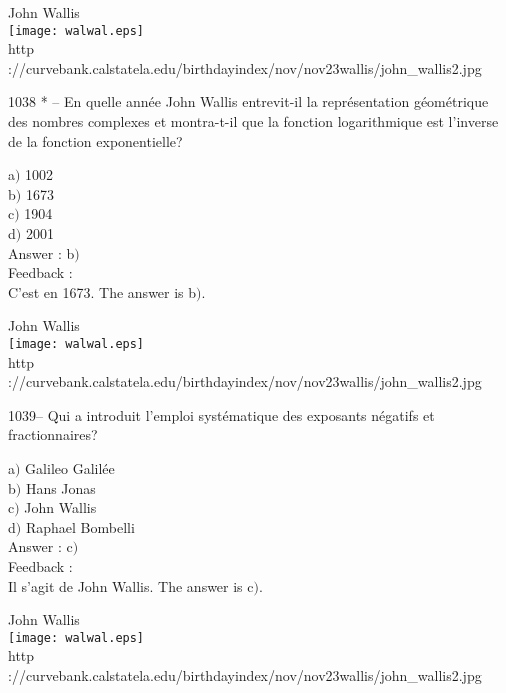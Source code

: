 ﻿\documentclass[letterpaper, 12pt]{article}
\begin{document}
        \begin{center}
        John Wallis\\
    \texttt{[image: walwal.eps]}\\
        {\footnotesize http
://curvebank.calstatela.edu/birthdayindex/nov/nov23wallis/john\_wallis2.jpg}
    \end{center}

1038 * -- En quelle ann\'ee John Wallis entrevit-il la
repr\'esentation g\'eom\'etrique des nombres complexes et
montra-t-il que la fonction logarithmique est l'inverse de la
fonction exponentielle?

a$)$ 1002 \\
b$)$ 1673  \\
c$)$ 1904  \\
d$)$ 2001 \\

Answer : b$)$\\

Feedback :\\
C'est en 1673.
The answer is b$)$.\\

        \begin{center}
        John Wallis\\
    \texttt{[image: walwal.eps]}\\
        {\footnotesize http
://curvebank.calstatela.edu/birthdayindex/nov/nov23wallis/john\_wallis2.jpg}
    \end{center}

1039-- Qui a introduit l'emploi syst\'ematique des exposants
n\'egatifs et fractionnaires?

a$)$ Galileo Galil\'ee \\
b$)$ Hans Jonas  \\
c$)$ John Wallis  \\
d$)$ Raphael Bombelli \\

Answer : c$)$\\

Feedback :\\
Il s'agit de John Wallis.
The answer is c$)$.\\

        \begin{center}
        John Wallis\\
    \texttt{[image: walwal.eps]}\\
        {\footnotesize http
://curvebank.calstatela.edu/birthdayindex/nov/nov23wallis/john\_wallis2.jpg}
    \end{center}
\end{document}
